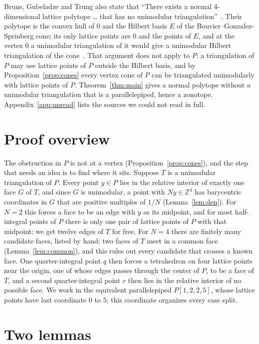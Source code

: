 \documentclass[11pt]{article}
\theoremstyle{definition}
\newcommand{\Z}{\mathbb{Z}}
\begin{document}
Bruns, Gubeladze and Trung also state that ``There exists a normal
4-dimensional lattice polytope \dots{} that has no unimodular
triangulation''~\cite[Proposition~1.2.4(c)]{BGT97}. Their polytope is the
convex hull of $0$ and the Hilbert basis $E$ of the
Bouvier--Gonzalez-Sprinberg cone; its only lattice points are $0$ and the
points of $E$, and at the vertex $0$ a unimodular triangulation of it would
give a unimodular Hilbert triangulation of the cone~\cite[proof of
Proposition~1.2.4(c), after Theorem~1.3.1]{BGT97}. That argument does not
apply to $P$: a triangulation of $P$ may use lattice points of $P$ outside
the Hilbert basis, and by Proposition~\ref{prop:cones} every vertex cone of
$P$ can be triangulated unimodularly with lattice points of $P$.
Theorem~\ref{thm:main} gives a normal polytope without a unimodular
triangulation that is a parallelepiped, hence a zonotope.
Appendix~\ref{app:unread} lists the sources we could not read in
full.

\section{Proof overview}

The obstruction in $P$ is not at a vertex (Proposition~\ref{prop:cones}),
and the step that needs an idea is to find where it sits. Suppose $T$ is a
unimodular triangulation of $P$. Every point $y\in P$ lies in the relative
interior of exactly one face $G$ of $T$, and since $G$ is unimodular, a
point with $Ny\in\Z^4$ has barycentric coordinates in $G$ that are positive
multiples of $1/N$ (Lemma~\ref{lem:den}). For $N=2$ this forces a face to
be an edge with $y$ as its midpoint, and for most half-integral points of
$P$ there is only one pair of lattice points of $P$ with that midpoint: we
get twelve edges of $T$ for free. For $N=4$ there are finitely many
candidate faces, listed by hand; two faces of $T$ meet in a common face
(Lemma~\ref{lem:common}), and this rules out every candidate that crosses a
known face. One quarter-integral point $q$ then forces a tetrahedron on four
lattice points near the origin, one of whose edges passes through the
center of $P$, to be a face of $T$, and a second quarter-integral point $r$
then lies in the relative interior of no possible face. We work in the
equivalent parallelepiped $P[1,2,2,5]$, whose lattice points have last
coordinate $0$ to $5$; this coordinate organizes every case split.

\section{Two lemmas}\label{sec:lemmas}
\end{document}
